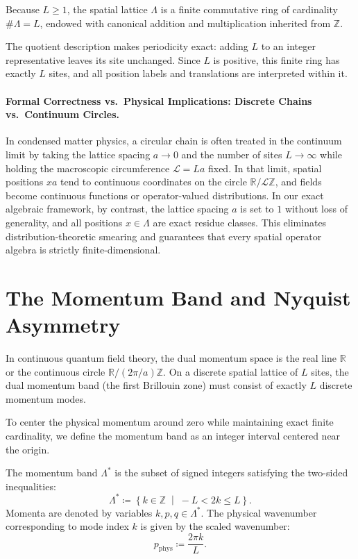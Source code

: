 Because $L \ge 1$, the spatial lattice $\Lambda$ is a finite commutative ring of cardinality $\#\Lambda = L$, endowed with canonical addition and multiplication inherited from $\mathbb{Z}$.

\begin{remark}
The quotient description makes periodicity exact: adding $L$ to an integer representative leaves its site unchanged. Since $L$ is positive, this finite ring has exactly $L$ sites, and all position labels and translations are interpreted within it.
\end{remark}

\paragraph{Formal Correctness vs.\ Physical Implications: Discrete Chains vs.\ Continuum Circles.}
In condensed matter physics, a circular chain is often treated in the continuum limit by taking the lattice spacing $a \to 0$ and the number of sites $L \to \infty$ while holding the macroscopic circumference $\mathcal{L} = L a$ fixed. In that limit, spatial positions $x a$ tend to continuous coordinates on the circle $\mathbb{R}/\mathcal{L}\mathbb{Z}$, and fields become continuous functions or operator-valued distributions. 
In our exact algebraic framework, by contrast, the lattice spacing $a$ is set to $1$ without loss of generality, and all positions $x \in \Lambda$ are exact residue classes. This eliminates distribution-theoretic smearing and guarantees that every spatial operator algebra is strictly finite-dimensional.

\section{The Momentum Band and Nyquist Asymmetry}

In continuous quantum field theory, the dual momentum space is the real line $\mathbb{R}$ or the continuous circle $\mathbb{R}/(2\pi/a)\mathbb{Z}$. On a discrete spatial lattice of $L$ sites, the dual momentum band (the first Brillouin zone) must consist of exactly $L$ discrete momentum modes.

To center the physical momentum around zero while maintaining exact finite cardinality, we define the momentum band as an integer interval centered near the origin.

\begin{definition}
The momentum band $\Lambda^*$ is the subset of signed integers satisfying the two-sided inequalities:
\begin{equation}
\Lambda^* \coloneqq \left\{ k \in \mathbb{Z} \;\middle|\; -L < 2k \le L \right\}.
\end{equation}
Momenta are denoted by variables $k, p, q \in \Lambda^*$. The physical wavenumber corresponding to mode index $k$ is given by the scaled wavenumber:
\begin{equation}
p_{\mathrm{phys}} \coloneqq \frac{2\pi k}{L}.
\end{equation}
\end{definition}

